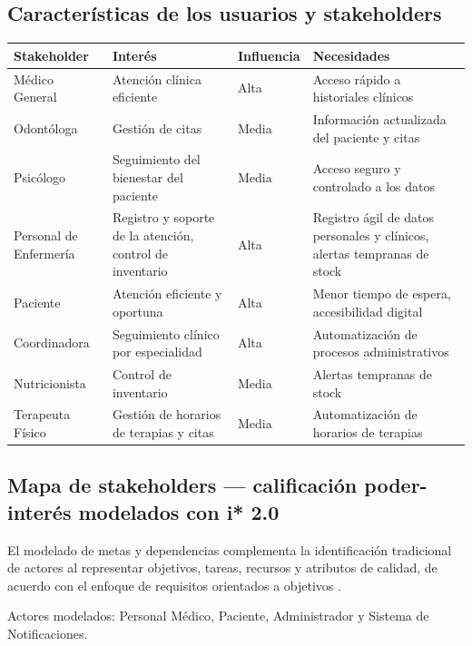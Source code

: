 \documentclass[11pt,a4paper]{article}
\begin{document}
	\subsection{ Características de los usuarios y stakeholders}
	
	\begin{longtable}{p{} p{} p{} p{}}
		
		\toprule
		\textbf{Stakeholder} &
		\textbf{Interés} &
		\textbf{Influencia} &
		\textbf{Necesidades} \\
		\midrule
		\endhead
		
		\bottomrule
		\endlastfoot
		Médico General & Atención clínica eficiente & Alta & Acceso rápido a historiales clínicos \\
		Odontóloga & Gestión de citas & Media & Información actualizada del paciente y citas \\
		Psicólogo & Seguimiento del bienestar del paciente & Media & Acceso seguro y controlado a los datos \\
		Personal de Enfermería & Registro y soporte de la atención, control de inventario & Alta & Registro ágil de datos personales y clínicos, alertas tempranas de stock \\
		Paciente & Atención eficiente y oportuna & Alta & Menor tiempo de espera, accesibilidad digital \\
		Coordinadora & Seguimiento clínico por especialidad & Alta & Automatización de procesos administrativos \\
		Nutricionista & Control de inventario & Media & Alertas tempranas de stock \\
		Terapeuta Físico & Gestión de horarios de terapias y citas & Media & Automatización de horarios de terapias \\
	\end{longtable}
	
	\subsection{ Mapa de stakeholders --- calificación poder-interés modelados con i* 2.0}
	
	El modelado de metas y dependencias complementa la identificación tradicional
	de actores al representar objetivos, tareas, recursos y atributos de calidad,
	de acuerdo con el enfoque de requisitos orientados a objetivos \cite{chung2000}.
	
	Actores modelados: Personal Médico, Paciente, Administrador y Sistema de Notificaciones.
	
\end{document}
